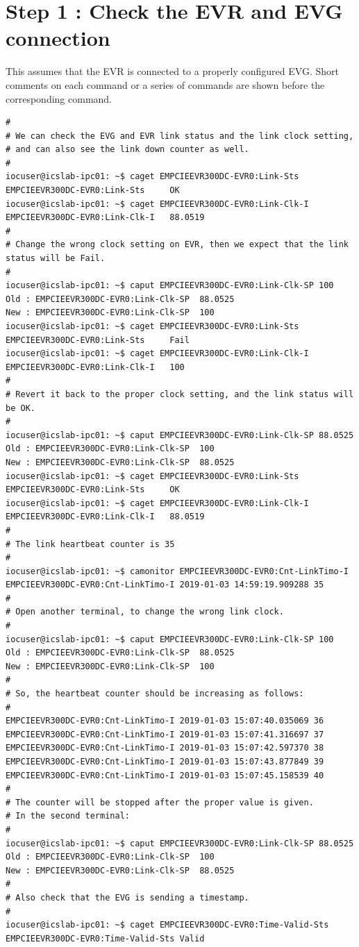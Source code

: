 \documentclass[11pt
  , a4paper
  , article
  , oneside
  , showtrims
]{memoir}
\begin{document}
{\section{Step 1 : Check the EVR and EVG connection}
This assumes that the EVR is connected to a properly configured EVG. Short comments on each command or a series of commands are shown before the corresponding command.
\begin{lstlisting}[style=termstyle]
#
# We can check the EVG and EVR link status and the link clock setting,
# and can also see the link down counter as well.
#
iocuser@icslab-ipc01: ~$ caget EMPCIEEVR300DC-EVR0:Link-Sts
EMPCIEEVR300DC-EVR0:Link-Sts     OK
iocuser@icslab-ipc01: ~$ caget EMPCIEEVR300DC-EVR0:Link-Clk-I
EMPCIEEVR300DC-EVR0:Link-Clk-I   88.0519
#
# Change the wrong clock setting on EVR, then we expect that the link status will be Fail.
#
iocuser@icslab-ipc01: ~$ caput EMPCIEEVR300DC-EVR0:Link-Clk-SP 100
Old : EMPCIEEVR300DC-EVR0:Link-Clk-SP  88.0525
New : EMPCIEEVR300DC-EVR0:Link-Clk-SP  100
iocuser@icslab-ipc01: ~$ caget EMPCIEEVR300DC-EVR0:Link-Sts
EMPCIEEVR300DC-EVR0:Link-Sts     Fail
iocuser@icslab-ipc01: ~$ caget EMPCIEEVR300DC-EVR0:Link-Clk-I
EMPCIEEVR300DC-EVR0:Link-Clk-I   100
#
# Revert it back to the proper clock setting, and the link status will be OK.
#
iocuser@icslab-ipc01: ~$ caput EMPCIEEVR300DC-EVR0:Link-Clk-SP 88.0525
Old : EMPCIEEVR300DC-EVR0:Link-Clk-SP  100
New : EMPCIEEVR300DC-EVR0:Link-Clk-SP  88.0525
iocuser@icslab-ipc01: ~$ caget EMPCIEEVR300DC-EVR0:Link-Sts
EMPCIEEVR300DC-EVR0:Link-Sts     OK
iocuser@icslab-ipc01: ~$ caget EMPCIEEVR300DC-EVR0:Link-Clk-I
EMPCIEEVR300DC-EVR0:Link-Clk-I   88.0519
#
# The link heartbeat counter is 35
#
iocuser@icslab-ipc01: ~$ camonitor EMPCIEEVR300DC-EVR0:Cnt-LinkTimo-I
EMPCIEEVR300DC-EVR0:Cnt-LinkTimo-I 2019-01-03 14:59:19.909288 35
#
# Open another terminal, to change the wrong link clock.
#
iocuser@icslab-ipc01: ~$ caput EMPCIEEVR300DC-EVR0:Link-Clk-SP 100
Old : EMPCIEEVR300DC-EVR0:Link-Clk-SP  88.0525
New : EMPCIEEVR300DC-EVR0:Link-Clk-SP  100
#
# So, the heartbeat counter should be increasing as follows:
#
EMPCIEEVR300DC-EVR0:Cnt-LinkTimo-I 2019-01-03 15:07:40.035069 36
EMPCIEEVR300DC-EVR0:Cnt-LinkTimo-I 2019-01-03 15:07:41.316697 37
EMPCIEEVR300DC-EVR0:Cnt-LinkTimo-I 2019-01-03 15:07:42.597370 38
EMPCIEEVR300DC-EVR0:Cnt-LinkTimo-I 2019-01-03 15:07:43.877849 39
EMPCIEEVR300DC-EVR0:Cnt-LinkTimo-I 2019-01-03 15:07:45.158539 40
#
# The counter will be stopped after the proper value is given.
# In the second terminal:
#
iocuser@icslab-ipc01: ~$ caput EMPCIEEVR300DC-EVR0:Link-Clk-SP 88.0525
Old : EMPCIEEVR300DC-EVR0:Link-Clk-SP  100
New : EMPCIEEVR300DC-EVR0:Link-Clk-SP  88.0525
#
# Also check that the EVG is sending a timestamp.
#
iocuser@icslab-ipc01: ~$ caget EMPCIEEVR300DC-EVR0:Time-Valid-Sts
EMPCIEEVR300DC-EVR0:Time-Valid-Sts Valid
\end{lstlisting}


}
\end{document}
